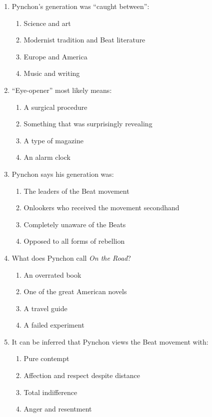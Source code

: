 \documentclass[10pt,a4paper]{article}
\begin{document}
\begin{enumerate}[label=\textbf{\arabic*.}, leftmargin=*]

\item Pynchon's generation was ``caught between'':
\begin{enumerate}[label=(\Alph*)]
\item Science and art
\item Modernist tradition and Beat literature
\item Europe and America
\item Music and writing
\end{enumerate}

\item ``Eye-opener'' most likely means:
\begin{enumerate}[label=(\Alph*)]
\item A surgical procedure
\item Something that was surprisingly revealing
\item A type of magazine
\item An alarm clock
\end{enumerate}

\item Pynchon says his generation was:
\begin{enumerate}[label=(\Alph*)]
\item The leaders of the Beat movement
\item Onlookers who received the movement secondhand
\item Completely unaware of the Beats
\item Opposed to all forms of rebellion
\end{enumerate}

\item What does Pynchon call \emph{On the Road}?
\begin{enumerate}[label=(\Alph*)]
\item An overrated book
\item One of the great American novels
\item A travel guide
\item A failed experiment
\end{enumerate}

\item It can be inferred that Pynchon views the Beat
movement with:
\begin{enumerate}[label=(\Alph*)]
\item Pure contempt
\item Affection and respect despite distance
\item Total indifference
\item Anger and resentment
\end{enumerate}
\end{enumerate}
\end{document}
